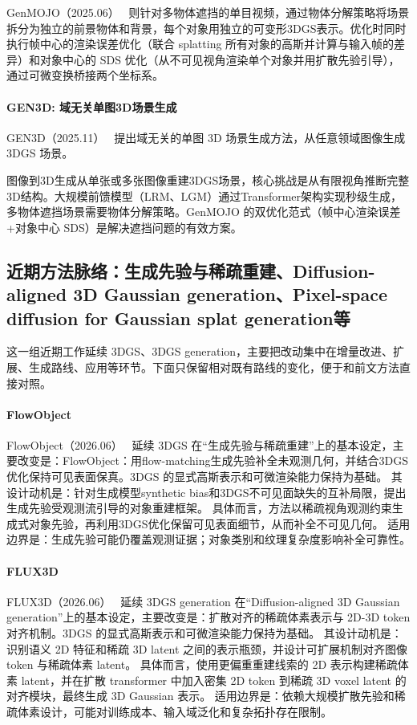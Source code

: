 GenMOJO（2025.06）~\cite{2506_12716} 则针对多物体遮挡的单目视频，通过物体分解策略将场景拆分为独立的前景物体和背景，每个对象用独立的可变形3DGS表示。优化时同时执行帧中心的渲染误差优化（联合 splatting 所有对象的高斯并计算与输入帧的差异）和对象中心的 SDS 优化（从不可见视角渲染单个对象并用扩散先验引导），通过可微变换桥接两个坐标系。

\paragraph{GEN3D: 域无关单图3D场景生成}

GEN3D（2025.11）~\cite{2511_14291} 提出域无关的单图 3D 场景生成方法，从任意领域图像生成 3DGS 场景。

\begin{takeaway}
图像到3D生成从单张或多张图像重建3DGS场景，核心挑战是从有限视角推断完整3D结构。大规模前馈模型（LRM、LGM）通过Transformer架构实现秒级生成，多物体遮挡场景需要物体分解策略。GenMOJO 的双优化范式（帧中心渲染误差+对象中心 SDS）是解决遮挡问题的有效方案。
\end{takeaway}


\subsection{近期方法脉络：生成先验与稀疏重建、Diffusion-aligned 3D Gaussian generation、Pixel-space diffusion for Gaussian splat generation等}

这一组近期工作延续 3DGS、3DGS generation，主要把改动集中在增量改进、扩展、生成路线、应用等环节。下面只保留相对既有路线的变化，便于和前文方法直接对照。

\paragraph{FlowObject}
FlowObject（2026.06）~\cite{2606_19019} 延续 3DGS 在“生成先验与稀疏重建”上的基本设定，主要改变是：FlowObject：用flow-matching生成先验补全未观测几何，并结合3DGS优化保持可见表面保真。3DGS 的显式高斯表示和可微渲染能力保持为基础。
其设计动机是：针对生成模型synthetic bias和3DGS不可见面缺失的互补局限，提出生成先验受观测流引导的对象重建框架。
具体而言，方法以稀疏视角观测约束生成式对象先验，再利用3DGS优化保留可见表面细节，从而补全不可见几何。
适用边界是：生成先验可能仍覆盖观测证据；对象类别和纹理复杂度影响补全可靠性。

\paragraph{FLUX3D}
FLUX3D（2026.06）~\cite{2606_24874} 延续 3DGS generation 在“Diffusion-aligned 3D Gaussian generation”上的基本设定，主要改变是：扩散对齐的稀疏体素表示与 2D-3D token 对齐机制。3DGS 的显式高斯表示和可微渲染能力保持为基础。
其设计动机是：识别语义 2D 特征和稀疏 3D latent 之间的表示瓶颈，并设计可扩展机制对齐图像 token 与稀疏体素 latent。
具体而言，使用更偏重重建线索的 2D 表示构建稀疏体素 latent，并在扩散 transformer 中加入密集 2D token 到稀疏 3D voxel latent 的对齐模块，最终生成 3D Gaussian 表示。
适用边界是：依赖大规模扩散先验和稀疏体素设计，可能对训练成本、输入域泛化和复杂拓扑存在限制。

